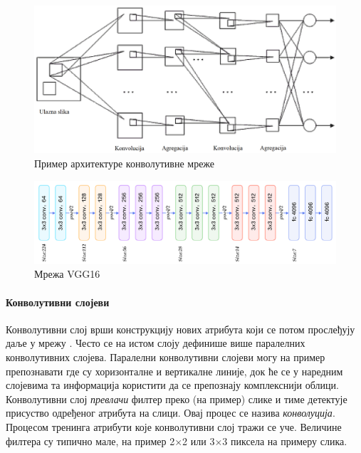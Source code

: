 \documentclass[a4paper]{article}
\begin{document}
\begin{figure}[h!]
\begin{center}
    \includegraphics[scale=0.2]{./resources/covnet2.png}
\end{center}
\caption{Пример архитектуре конволутивне мреже}
\label{fig:covnet}
\end{figure}


\begin{figure}[h!]
\begin{center}
    \includegraphics[width=\textwidth]{./resources/vgg16}
\end{center}
\caption{Мрежа VGG16}
\label{fig:vgg16}
\end{figure}

\paragraph{Конволутивни слојеви}
Конволутивни слој врши конструкцију нових атрибута који се потом
прослеђују даље у мрежу \cite{bishop, ni}. Често се на истом слоју дефинише више
паралелних конволутивних слојева. Паралелни конволутивни слојеви
могу на пример препознавати где су хоризонталне и вертикалне линије,
док ће се у наредним слојевима та информација користити да се препознају
комплекснији облици. Конволутивни слој \textit{превлачи} филтер преко
(на пример) слике и тиме детектује присуство одређеног атрибута на слици.
Овај процес се назива \textit{конволуција}.
Процесом тренинга атрибути које конволутивни слој тражи се уче. Величине
филтера су типично мале, на пример 2$\times$2 или 3$\times$3 пиксела на примеру слика.
\end{document}
